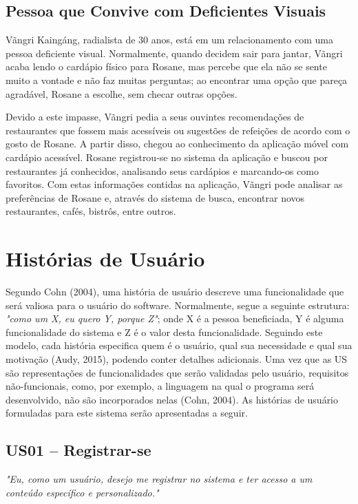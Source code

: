 \subsection{Pessoa que Convive com Deficientes Visuais}
Vãngri Kaingáng, radialista de 30 anos, está em um relacionamento com uma pessoa deficiente visual. Normalmente, quando decidem sair para jantar, Vãngri acaba lendo o cardápio físico para Rosane, mas percebe que ela não se sente muito a vontade e não faz muitas perguntas; ao encontrar uma opção que pareça agradável, Rosane a escolhe, sem checar outras opções.

Devido a este impasse, Vãngri pedia a seus ouvintes recomendações de restaurantes que fossem mais acessíveis ou sugestões de refeições de acordo com o gosto de Rosane. A partir disso, chegou ao conhecimento da aplicação móvel com cardápio acessível. Rosane registrou-se no sistema da aplicação e buscou por restaurantes já conhecidos, analisando seus cardápios e marcando-os como favoritos. Com estas informações contidas na aplicação, Vãngri pode analisar as preferências de Rosane e, através do sistema de busca, encontrar novos restaurantes, cafés, bistrôs, entre outros.

\section{Histórias de Usuário}

Segundo Cohn (2004)\nocite{COHN2004}, uma história de usuário descreve uma funcionalidade que será valiosa para o usuário do software. Normalmente, segue a seguinte estrutura: \textit{"como um X, eu quero Y, porque Z"}; onde X é a pessoa beneficiada, Y é alguma funcionalidade do sistema e Z é o valor desta funcionalidade. Seguindo este modelo, cada história especifica quem é o usuário, qual sua necessidade e qual sua motivação (Audy, 2015), podendo conter detalhes adicionais. Uma vez que as US são representações de funcionalidades que serão validadas pelo usuário, requisitos não-funcionais, como, por exemplo, a linguagem na qual o programa será desenvolvido, não são incorporados nelas (Cohn, 2004). As histórias de usuário formuladas para este sistema serão apresentadas a seguir.

\subsection{US01 -- Registrar-se}

\textit{"Eu, como um usuário, desejo me registrar no sistema e ter acesso a um conteúdo específico e personalizado."}


